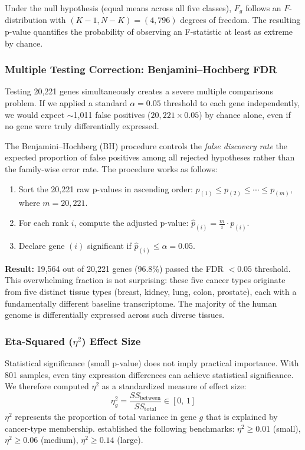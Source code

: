 \documentclass{article}
\begin{document}
Under the null hypothesis (equal means across all five classes), $F_g$ follows an $F$-distribution with $(K-1, N-K) = (4, 796)$ degrees of freedom. The resulting p-value quantifies the probability of observing an F-statistic at least as extreme by chance.

\subsubsection{Multiple Testing Correction: Benjamini--Hochberg FDR}
Testing 20{,}221 genes simultaneously creates a severe multiple comparisons problem. If we applied a standard $\alpha = 0.05$ threshold to each gene independently, we would expect $\sim$1{,}011 false positives ($20{,}221 \times 0.05$) by chance alone, even if no gene were truly differentially expressed.

The Benjamini--Hochberg (BH) procedure \citep{benjamini1995controlling} controls the \textit{false discovery rate} the expected proportion of false positives among all rejected hypotheses rather than the family-wise error rate. The procedure works as follows:
\begin{enumerate}[leftmargin=2em]
\item Sort the 20{,}221 raw p-values in ascending order: $p_{(1)} \le p_{(2)} \le \cdots \le p_{(m)}$, where $m = 20{,}221$.
\item For each rank $i$, compute the adjusted p-value: $\hat{p}_{(i)} = \frac{m}{i} \cdot p_{(i)}$.
\item Declare gene $(i)$ significant if $\hat{p}_{(i)} \le \alpha = 0.05$.
\end{enumerate}

\textbf{Result:} 19{,}564 out of 20{,}221 genes (96.8\%) passed the FDR $< 0.05$ threshold. This overwhelming fraction is not surprising: these five cancer types originate from five distinct tissue types (breast, kidney, lung, colon, prostate), each with a fundamentally different baseline transcriptome. The majority of the human genome is differentially expressed across such diverse tissues.

\subsubsection{Eta-Squared ($\eta^2$) Effect Size}
Statistical significance (small p-value) does not imply practical importance. With 801 samples, even tiny expression differences can achieve statistical significance. We therefore computed $\eta^2$ as a standardized measure of effect size:
\[
\eta^2_g = \frac{SS_{\text{between}}}{SS_{\text{total}}} \in [0,\, 1]
\]
$\eta^2$ represents the proportion of total variance in gene $g$ that is explained by cancer-type membership. \citet{cohen1988statistical} established the following benchmarks: $\eta^2 \ge 0.01$ (small), $\eta^2 \ge 0.06$ (medium), $\eta^2 \ge 0.14$ (large).
\end{document}
